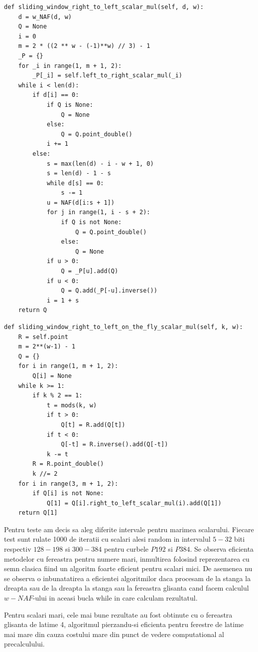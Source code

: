 \begin{lstlisting}
def sliding_window_right_to_left_scalar_mul(self, d, w):
    d = w_NAF(d, w)
    Q = None
    i = 0
    m = 2 * ((2 ** w - (-1)**w) // 3) - 1
    _P = {}
    for _i in range(1, m + 1, 2):
        _P[_i] = self.left_to_right_scalar_mul(_i)
    while i < len(d):
        if d[i] == 0:
            if Q is None:
                Q = None
            else:
                Q = Q.point_double()
            i += 1
        else:
            s = max(len(d) - i - w + 1, 0)
            s = len(d) - 1 - s
            while d[s] == 0:
                s -= 1
            u = NAF(d[i:s + 1])
            for j in range(1, i - s + 2):
                if Q is not None:
                    Q = Q.point_double()
                else:
                    Q = None
            if u > 0:
                Q = _P[u].add(Q)
            if u < 0:
                Q = Q.add(_P[-u].inverse())
            i = 1 + s
    return Q
\end{lstlisting}

\begin{lstlisting}
def sliding_window_right_to_left_on_the_fly_scalar_mul(self, k, w):
    R = self.point
    m = 2**(w-1) - 1
    Q = {}
    for i in range(1, m + 1, 2):
        Q[i] = None
    while k >= 1:
        if k % 2 == 1:
            t = mods(k, w)
            if t > 0:
                Q[t] = R.add(Q[t])
            if t < 0:
                Q[-t] = R.inverse().add(Q[-t])
            k -= t
        R = R.point_double()
        k //= 2
    for i in range(3, m + 1, 2):
        if Q[i] is not None:
            Q[1] = Q[i].right_to_left_scalar_mul(i).add(Q[1])
    return Q[1]
\end{lstlisting}

Pentru teste am decis sa aleg diferite intervale pentru marimea scalarului. Fiecare test sunt rulate 1000 de iteratii cu scalari alesi random in intervalul $5-32$ biti respectiv $128-198$ si $300-384$ pentru curbele $P192$ si $P384$. Se observa eficienta metodelor cu fereastra pentru numere mari, inmultirea folosind reprezentarea cu semn clasica fiind un algoritm foarte eficient pentru scalari mici. De asemenea nu se observa o inbunatatirea a eficientei algoritmilor daca procesam de la stanga la dreapta sau de la dreapta la stanga sau la fereastra glisanta cand facem calculul $w-NAF$-ului in aceasi bucla while in care calculam rezultatul.

Pentru scalari mari, cele mai bune rezultate au fost obtinute cu o fereastra glisanta de latime 4, algoritmul pierzandu-si eficienta pentru ferestre de latime mai mare din cauza costului mare din punct de vedere computational al precalculului.

